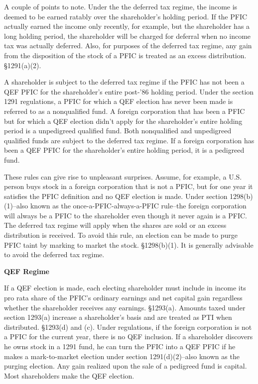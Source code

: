 	     A couple of points to note.  Under the the deferred tax regime, the income is deemed to be earned ratably over the shareholder's holding period.  If the PFIC actually earned the income only recently, for example, but the shareholder has a long holding period, the shareholder will be charged for deferral when no income tax was actually deferred.  Also, for purposes of the deferred tax regime, any gain from the disposition of the stock of a PFIC is treated as an excess distribution.  \S1291(a)(2).
	     
	     A shareholder is subject to the deferred tax regime if the PFIC has not been a QEF PFIC for the shareholder's entire post-'86 holding period.  Under the section 1291 regulations, a PFIC for which a QEF election has never been made is referred to as a nonqualified fund.  A foreign corporation that has been a PFIC but for which a QEF election didn't apply for the shareholder's entire holding period is a unpedigreed qualified fund.  Both nonqualified and unpedigreed qualified funds are subject to the deferred tax regime.  If a foreign corporation has been a QEF PFIC for the shareholder's entire holding period, it is a pedigreed fund.
	     
	     These rules can give rise to unpleasant surprises.  Assume, for example, a U.S. person buys stock in a foreign corporation that is not a PFIC, but for one year it satisfies the PFIC definition and no QEF election is made.  Under section 1298(b)(1)--also known as the once-a-PFIC-always-a-PFIC rule--the foreign corporation will always be a PFIC to the shareholder even though it never again is a PFIC.  The deferred tax regime will apply when the shares are sold or an excess distribution is received.  To avoid this rule, an election can be made to purge PFIC taint by marking to market the stock.  \S1298(b)(1).  It is generally advisable to avoid the deferred tax regime.  
	     
	  \begin{center}   
	     \textbf{QEF Regime}
	     \end{center}	       
	       If a QEF election is made, each electing shareholder must include in income its pro rata share of the PFIC's ordinary earnings and net capital gain regardless whether the shareholder receives any earnings.  \S1293(a).  Amounts taxed under section 1293(a) increase a shareholder's basis and are treated as PTI when distributed.  \S1293(d) and (c).  Under regulations, if the foreign corporation is not a PFIC for the current year, there is no QEF inclusion.  If a shareholder discovers he owns stock in a 1291 fund, he can turn the PFIC into a QEF PFIC if he makes a mark-to-market election under section 1291(d)(2)--also known as the purging election.  Any gain realized upon the sale of a pedigreed fund is capital.  Most shareholders make the QEF election.
	       
